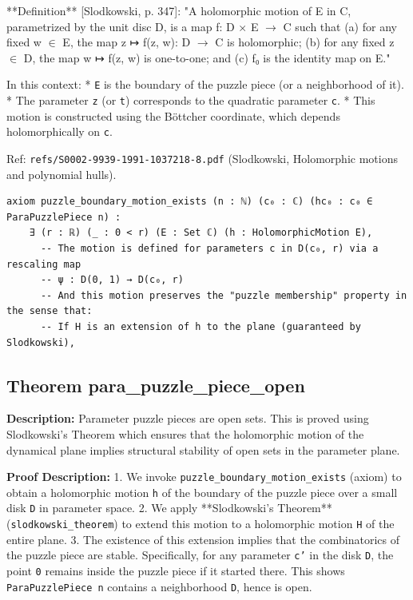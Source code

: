    **Definition** [Slodkowski, p. 347]:
    "A holomorphic motion of E in C, parametrized by the unit disc D, is a map f: D × E $\to$ C
    such that (a) for any fixed w $\in$ E, the map z ↦ f(z, w): D $\to$ C is holomorphic;
    (b) for any fixed z $\in$ D, the map w ↦ f(z, w) is one-to-one; and (c) f₀ is the identity map on E."

    In this context:
    *   \texttt{E} is the boundary of the puzzle piece (or a neighborhood of it).
    *   The parameter \texttt{z} (or \texttt{t}) corresponds to the quadratic parameter \texttt{c}.
    *   This motion is constructed using the Böttcher coordinate, which depends holomorphically on \texttt{c}.

    Ref: \texttt{refs/S0002-9939-1991-1037218-8.pdf} (Slodkowski, Holomorphic motions and polynomial hulls).

\begin{lstlisting}[language=Lean]
axiom puzzle_boundary_motion_exists (n : ℕ) (c₀ : ℂ) (hc₀ : c₀ ∈ ParaPuzzlePiece n) :
    ∃ (r : ℝ) (_ : 0 < r) (E : Set ℂ) (h : HolomorphicMotion E),
      -- The motion is defined for parameters c in D(c₀, r) via a rescaling map
      -- ψ : D(0, 1) → D(c₀, r)
      -- And this motion preserves the "puzzle membership" property in the sense that:
      -- If H is an extension of h to the plane (guaranteed by Slodkowski),
\end{lstlisting}

\subsection*{Theorem para\_puzzle\_piece\_open}
\textbf{Description:} Parameter puzzle pieces are open sets.
    This is proved using Slodkowski's Theorem which ensures that the holomorphic motion
    of the dynamical plane implies structural stability of open sets in the parameter plane.

\textbf{Proof Description:} 1.  We invoke \texttt{puzzle\_boundary\_motion\_exists} (axiom) to obtain a holomorphic motion \texttt{h}
        of the boundary of the puzzle piece over a small disk \texttt{D} in parameter space.
    2.  We apply **Slodkowski's Theorem** (\texttt{slodkowski\_theorem}) to extend this motion to a
        holomorphic motion \texttt{H} of the entire plane.
    3.  The existence of this extension implies that the combinatorics of the puzzle piece are stable.
        Specifically, for any parameter \texttt{c'} in the disk \texttt{D}, the point \texttt{0} remains inside the
        puzzle piece if it started there. This shows \texttt{ParaPuzzlePiece n} contains a neighborhood \texttt{D},
        hence is open.

